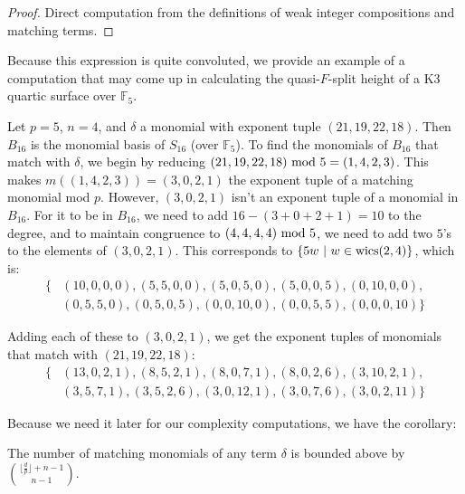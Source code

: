 \begin{proof}
    Direct computation from the definitions of weak integer compositions and matching terms.
\end{proof}


Because this expression is quite convoluted, we 
provide an example of a computation 
that may come up in calculating the quasi-\(F\)-split 
height of a K3 quartic surface over $\mathbb{F}_5$.

\begin{ex}
    Let $p = 5$, \(n = 4\), and $\delta$ a monomial 
    with exponent tuple $(21, 19, 22, 18)$. 
    Then $B_{16}$ is the monomial basis of 
    \(S_{16}\) (over $\mathbb{F}_5$). 
    To find the monomials of $B_{16}$ that match with 
    $\delta$, we begin by reducing $(21, 19, 22, 18) \text{ mod } 5 = (1, 4, 2, 3)$.
    This makes $m((1, 4, 2, 3)) = (3, 0, 2, 1)$ the 
    exponent tuple of a matching monomial mod \(p\).
    However, \((3, 0, 2, 1)\) isn't an exponent tuple of a monomial in $B_{16}$. 
    For it to be in $B_{16}$, we need to add $16 - (3 + 0 + 2 + 1) = 10$ 
    to the degree, and to maintain congruence to 
    $(4, 4, 4, 4) \text{ mod } 5$, we need to add two $5$'s 
    to the elements of $(3, 0, 2, 1)$. This corresponds 
    to $\{5w ~|~ w \in \operatorname{wics}(2, 4)\}$, which is:
    \begin{align*}
        \{&(10, 0, 0, 0), (5, 5, 0, 0), (5, 0, 5, 0), (5, 0, 0, 5), (0, 10, 0, 0), \\
        &(0, 5, 5, 0), (0, 5, 0, 5), (0, 0, 10, 0), (0, 0, 5, 5), (0, 0, 0, 10)\}
    \end{align*}
        
    \noindent Adding each of these to $(3, 0, 2, 1)$, we get the 
    exponent tuples of monomials that match with $(21, 19, 22, 18)$:
    \begin{align*}
        \{&(13, 0, 2, 1), (8, 5, 2, 1), (8, 0, 7, 1), (8, 0, 2, 6), (3, 10, 2, 1), \\
        &(3, 5, 7, 1), (3, 5, 2, 6), (3, 0, 12, 1), (3, 0, 7, 6), (3, 0, 2, 11)\}
    \end{align*}    
\end{ex}

Because we need it later for our complexity computations, we have the corollary:

\begin{cor}
    \label{cor:num:matches}
    The number of matching monomials of any term $\delta$ is 
    bounded above by $\binom{\lfloor \frac{d}{p} \rfloor + n - 1}{n - 1}$.
\end{cor}

